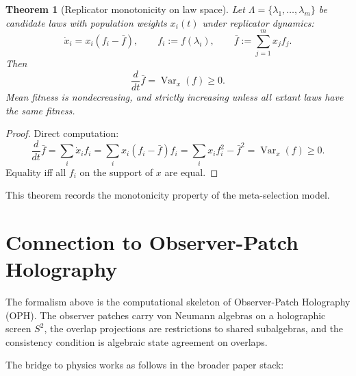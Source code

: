 \documentclass[11pt]{article}
\newtheorem{theorem}{Theorem}[section]
\theoremstyle{remark}
\theoremstyle{plain}
\begin{document}
\begin{theorem}[Replicator monotonicity on law space]\label{thm:replicator}
Let $\Lambda=\{\lambda_1,\dots,\lambda_m\}$ be candidate laws with population weights $x_i(t)$ under replicator dynamics:
\[
\dot{x}_i = x_i(f_i - \bar{f}),
\qquad
f_i := f(\lambda_i),
\qquad
\bar{f} := \sum_{j=1}^m x_j f_j.
\]
Then
\[
\frac{d}{dt}\bar{f} = \operatorname{Var}_x(f) \ge 0.
\]
Mean fitness is nondecreasing, and strictly increasing unless all extant laws have the same fitness.
\end{theorem}

\begin{proof}
Direct computation:
\[
\frac{d}{dt}\bar{f}
=
\sum_i \dot{x}_i f_i
=
\sum_i x_i(f_i - \bar{f})f_i
=
\sum_i x_i f_i^2 - \bar{f}^2
=
\operatorname{Var}_x(f) \ge 0.
\]
Equality iff all $f_i$ on the support of $x$ are equal.
\end{proof}

This theorem records the monotonicity property of the meta-selection model.


\section{Connection to Observer-Patch Holography}

The formalism above is the computational skeleton of Observer-Patch Holography (OPH). The observer patches carry von Neumann algebras on a holographic screen $S^2$, the overlap projections are restrictions to shared subalgebras, and the consistency condition is algebraic state agreement on overlaps.

The bridge to physics works as follows in the broader paper stack:
\end{document}
